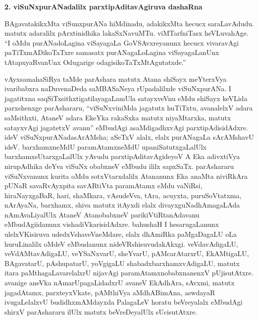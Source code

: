 \bigskip
\begin{center}
{\Large\bf 2. viSuNxpurANadalilx parxtipAditavAgiruva dashaRna}
\end{center}

BAgavatakikxMta viSunxpurANa hiMdinadu, adakikxMta hecucx saraLavAdudu. matutx adaralilx pArxtinidhika lakaSxNavuMTu. viMTarfniTasx heVLuvahAge. ``I oMdu purANa\-doLagina viSayagaLa GoVSAvxreyanunx hecucx vivaravAgi paTiTxmADikoTaTxre samasatx purANagaLoLagina viSayagaLanUnx tAtapxyaRvanUnx Odugarige odagisikoTaTxMtAgu\-tatxde.''

vAyxsamahaSiRya taMde parAshara matutx Atana shiSayx meYterxVya ivaribabxra naDuve\break naDeda saMBASaNeya rUpadalilxde viSuNxpurANa. I jagatitxna saqSiTxsithxtigatilayagaLa\break mUla satayxveVnu eMdu shiSayx keVLida parxshenxge parAshararu, ``viSuNxviniMda jagatutx huTiTxtu, avanalelxV adara saMsithxti, AtaneV adara EkeYka rakaSxka matutx niyaMtarxka, matutx satayx\-vAgi jagatetxV avanu'' eMbudAgi asaMdigadhxvAgi parxtipAdisidAdxre. ideV viSuNxpurANada\break sArAMsha; aSeTxV alalx, elalx purANagaLa sArAMshavU ideV. barxhamxneMdU paramAtamx\-neMdU upaniSatutxgaLalUlx barxhamxsUtarxgaLalUlx yAvudu parxtipAditavAgideyoV A Eka adivxtiVya nirupAdhika deYva viSuNx obabxneV eMbudu ililx sapxSaTx. parAshararu viSuNx\-vanunx kurita oMdu sotxVtarxdalilx Atananunx Eka anaMta niviRkAra pUNaR savaR\-vAyxpita savARtiVta paramAtamx eMdu vaNiRsi, hiraNayxgaBaR, hari, shaMkara, vAsudeVva, tAra, acuyxta, puruSoVtatxma, nArAyaNa, barxhamx, shiva matutx itAyxdi elalx divayxguNa\-dhAma\break\-gaLAda nAmAvaLiyalUlx AtaneV AtanobabxneV parikiVtiRtanAdavanu eMbudAgi\break idanunx vishadiVkarisidAdxre. bahushaH I hesarugaLanunx ulelxVKisiruva udedxVsha\break\-veVneMdare, elalx dhAmiRka paMgaDagaLU oLa huruLinalilx oMdeV eMbudanunx nideVR\-shisuvudakAkxgi. veVdavAdigaLU, veVdAMtavAdigaLU, veYSaNxvarU, sheYvarU, pAMca\-rAtarxrU, EkAMtigaLU, BAgavatarU, pAshupatarU, yoVgigaLU shabadxbarxhamxvAdi\-gaLU, matutx itara paMthagaLavarelalxrU nijavAgi paramAtamxnobabxnanenxV pUjisutAtxre. avanige aneVka nAmarUpagaLidadxrU avaneV EkAdhAra, sAvxmi, matutx jagadAtamx, parxteyxVkate, pAMthiVya aMdhABimAna, aswdayaR ivugaLelalxvU budidhxmAMdayxda PalagaLeV horatu beVreyalalx eMbudAgi shirxV parAshararu ilUlx matutx beVreDeyalUlx sUcisutAtxre.

